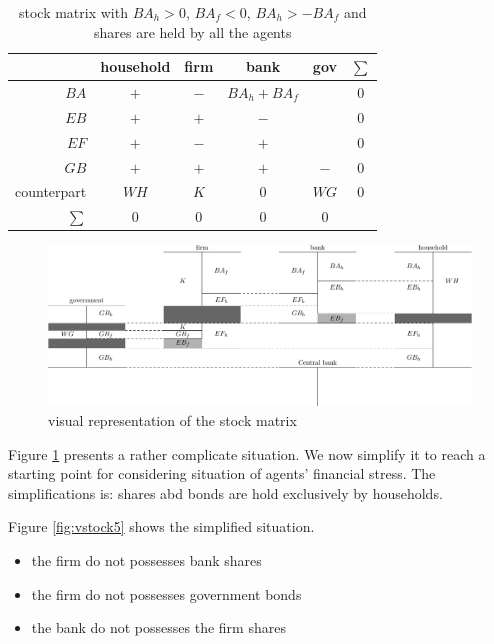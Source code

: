 \documentclass{article}
\begin{document}
\begin{table}[p]
	\centering
\begin{tabular}{r c c c c c}
	\hline
	& household 	& \parbox{1.5cm}{\centerline{firm}} & \parbox{1.5cm}{\centerline{bank}} & \parbox{1.5cm}{\centerline{gov}} &$\sum$\\
\hline
\hline
$BA$	&	$+$	&$-$	&$BA_h+BA_f$&&0\\
$EB$	&	$+$	&$+$	&$-$&&0\\
$EF$	&	$+$	&$-$	&$+$&&0\\
$GB$	&	$+$	&$+$	&$+$&$-$&0\\
	\hline
counterpart	&	$WH$	&$K$&0&$WG$	&0\\
	\hline
	\hline
$\sum$ &	0	&0	&0&0
\end{tabular}
	\caption{stock matrix with $BA_h>0$, $BA_f<0$, $BA_h>-BA_f$ and shares are held by all the agents}
	\label{tab:sm3}
\end{table}

\begin{figure}[p]
\hskip-3cm
\includegraphics[scale=0.8]{balances-2.pdf}
	\caption{visual representation of the stock matrix}
	\label{fig:vstock2}
\end{figure}

\clearpage


Figure \ref{fig:vstock2} presents a rather complicate situation. We now simplify it to reach a starting point for considering situation of agents' financial stress. 
The simplifications is: shares abd bonds are hold exclusively by households. 

Figure \ref{fig:vstock5} shows the simplified situation.   

\iffalse
\begin{itemize}
	\item the firm do not possesses bank shares
	\item the firm do not possesses government bonds
	\item the bank do not possesses the firm shares
\end{itemize}
\end{document}
